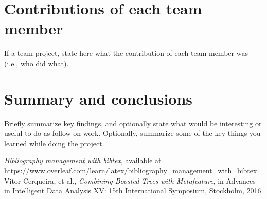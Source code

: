 \documentclass[singlecolumn]{article}
\begin{document}
\section{Contributions of each team member}
If a team project, state here what the contribution of each team member was (i.e., who did what). 

\section{Summary and conclusions}
Briefly summarize key findings, and optionally state what would be interesting or useful to do as follow-on work. Optionally, summarize some of the key things you learned while doing the project.  



\begin{thebibliography}{2}
	 \textit{Bibliography management with bibtex}, available at \url{https://www.overleaf.com/learn/latex/bibliography_management_with_bibtex}
	 Vitor Cerqueira, et al., \textit{Combining Boosted Trees with Metafeature}, in Advances in Intelligent Data Analysis XV: 15th International Symposium, Stockholm, 2016.
\end{thebibliography}

%
\end{document}
